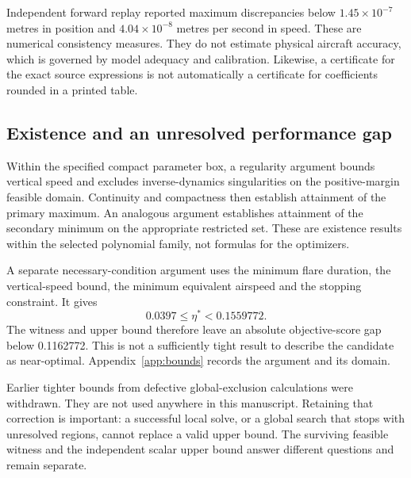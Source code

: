 Independent forward replay reported maximum discrepancies below $1.45\times10^{-7}$ metres in position and $4.04\times10^{-8}$ metres per second in speed. These are numerical consistency measures. They do not estimate physical aircraft accuracy, which is governed by model adequacy and calibration. Likewise, a certificate for the exact source expressions is not automatically a certificate for coefficients rounded in a printed table.

\subsection{Existence and an unresolved performance gap}
Within the specified compact parameter box, a regularity argument bounds vertical speed and excludes inverse-dynamics singularities on the positive-margin feasible domain. Continuity and compactness then establish attainment of the primary maximum. An analogous argument establishes attainment of the secondary minimum on the appropriate restricted set. These are existence results within the selected polynomial family, not formulas for the optimizers.

A separate necessary-condition argument uses the minimum flare duration, the vertical-speed bound, the minimum equivalent airspeed and the stopping constraint. It gives
\begin{equation}
0.0397\leq\eta^*<0.1559772.
\label{eq:bracket}
\end{equation}
The witness and upper bound therefore leave an absolute objective-score gap below 0.1162772. This is not a sufficiently tight result to describe the candidate as near-optimal. Appendix~\ref{app:bounds} records the argument and its domain.

Earlier tighter bounds from defective global-exclusion calculations were withdrawn. They are not used anywhere in this manuscript. Retaining that correction is important: a successful local solve, or a global search that stops with unresolved regions, cannot replace a valid upper bound. The surviving feasible witness and the independent scalar upper bound answer different questions and remain separate.

